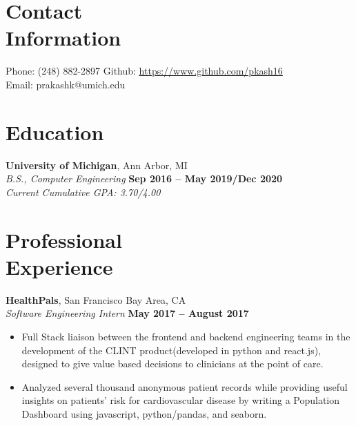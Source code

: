 \documentclass[margin,line]{resume}
\begin{document}
\begin{resume}
    \section{\mysidestyle Contact\\Information}

    Phone: (248) 882-2897       \hfill Github: \url{https://www.github.com/pkash16} \\
    \noindent Email: prakashk@umich.edu  \vspace{0mm}\\\vspace{-4.5mm}

    \section{\mysidestyle Education}

    \textbf{University of Michigan}, Ann Arbor, MI \vspace{2mm}\\\vspace{1mm}%
    \textsl{B.S., Computer Engineering} \hfill \textbf{Sep 2016 -- May 2019/Dec 2020}\\
   	\emph{Current Cumulative GPA: 3.70/4.00}

    \section{\mysidestyle Professional\\Experience}
    \textbf{HealthPals}, San Francisco Bay Area, CA \vspace{2mm}\\\vspace{1mm}%
    \textsl{Software Engineering Intern} \hfill \textbf{May 2017 -- August 2017}
    \begin{itemize}
    \item Full Stack liaison between the frontend and backend engineering teams in the development of the CLINT product(developed in python and react.js), designed to give value based decisions to clinicians at the point of care.
    \item Analyzed several thousand anonymous patient records while providing useful insights on patients' risk for cardiovascular disease by writing a Population Dashboard using javascript, python/pandas, and seaborn.
    \end{itemize}




\end{resume}
\end{document}
